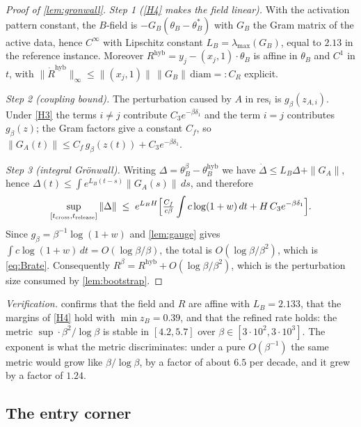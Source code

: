 \documentclass[11pt]{article}
\theoremstyle{definition}
\theoremstyle{remark}
\newcommand{\trel}{t_{\mathrm{release}}}
\newcommand{\hyb}{\mathrm{hyb}}
\begin{document}
\begin{proof}[Proof of \cref{lem:gronwall}]
\emph{Step 1 (\eqref{H4} makes the field linear).} With the activation pattern
constant, the $B$-field is $-G_B(\theta_B-\theta_B^\ast)$ with $G_B$ the Gram
matrix of the active data, hence $C^\infty$ with Lipschitz constant
$L_B=\lambda_{\max}(G_B)$, equal to $2.13$ in the reference instance. Moreover
$R^{\hyb}=y_j-(x_j,1)\cdot\theta_B$ is affine in $\theta_B$ and $C^1$ in $t$,
with $\|\dot R^{\hyb}\|_\infty\le\|(x_j,1)\|\,\|G_B\|\,\mathrm{diam}=:C_R$
explicit.

\emph{Step 2 (coupling bound).} The perturbation caused by $A$ in
$\mathrm{res}_i$ is $g_\beta(z_{A,i})$. Under \eqref{H3} the terms $i\ne j$
contribute $C_3e^{-\beta\delta_1}$ and the term $i=j$ contributes $g_\beta(z)$;
the Gram factors give a constant $C_f$, so
$\|G_A(t)\|\le C_f\,g_\beta(z(t))+C_3e^{-\beta\delta_1}$.

\emph{Step 3 (integral Gr\"onwall).} Writing $\Delta=\theta_B^\beta-\theta_B^{\hyb}$
we have $\dot\Delta\le L_B\Delta+\|G_A\|$, hence
$\Delta(t)\le\int e^{L_B(t-s)}\|G_A(s)\|\,ds$, and therefore
\[
\sup_{[t_{\mathrm{cross}},\trel]}\|\Delta\|
\;\le\;e^{L_BH}\Bigl[\tfrac{C_f}{c\beta}\int c\log(1+w)\,dt
+H\,C_3e^{-\beta\delta_1}\Bigr].
\]
Since $g_\beta=\beta^{-1}\log(1+w)$ and \cref{lem:gauge} gives
$\int c\log(1+w)\,dt=O(\log\beta/\beta)$, the total is $O(\log\beta/\beta^{2})$,
which is \eqref{eq:Brate}. Consequently $R^\beta=R^{\hyb}+O(\log\beta/\beta^{2})$,
which is the perturbation size consumed by \cref{lem:bootstrap}.
\end{proof}

\noindent\emph{Verification.}  confirms that the
field and $R$ are affine with $L_B=2.133$, that the margins of \eqref{H4} hold
with $\min z_B=0.39$, and that the refined rate holds: the metric
$\sup\cdot\beta^{2}/\log\beta$ is stable in $[4.2,5.7]$ over
$\beta\in[3\cdot10^2,3\cdot10^3]$. The exponent is what the metric discriminates:
under a pure $O(\beta^{-1})$ the same metric would grow like $\beta/\log\beta$,
by a factor of about $6.5$ per decade, and it grew by a factor of $1.24$.


\subsection{The entry corner}\label{app:L3}
\end{document}
